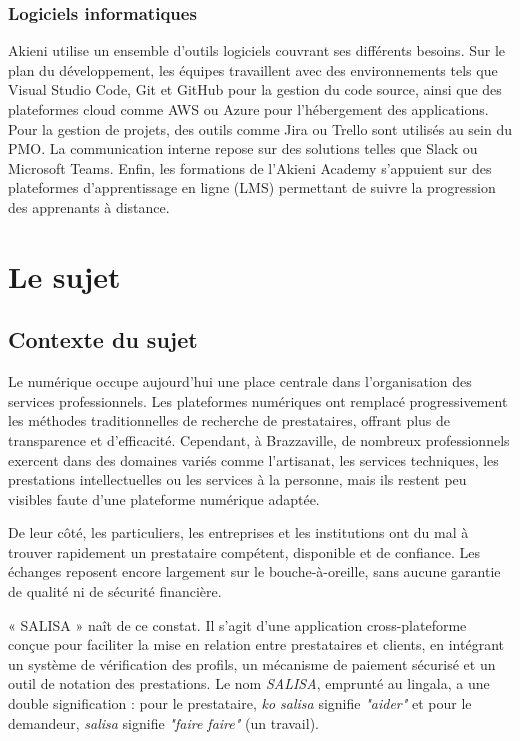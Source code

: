 \subsubsection{Logiciels informatiques}

Akieni utilise un ensemble d'outils logiciels couvrant ses différents besoins. Sur le plan du développement, les équipes travaillent avec des environnements tels que Visual Studio Code, Git et GitHub pour la gestion du code source, ainsi que des plateformes cloud comme AWS ou Azure pour l'hébergement des applications. Pour la gestion de projets, des outils comme Jira ou Trello sont utilisés au sein du PMO. La communication interne repose sur des solutions telles que Slack ou Microsoft Teams. Enfin, les formations de l'Akieni Academy s'appuient sur des plateformes d'apprentissage en ligne (LMS) permettant de suivre la progression des apprenants à distance.

\section{Le sujet}

\subsection{Contexte du sujet}

Le numérique occupe aujourd'hui une place centrale dans l'organisation des services professionnels. Les plateformes numériques ont remplacé progressivement les méthodes traditionnelles de recherche de prestataires, offrant plus de transparence et d'efficacité. Cependant, à Brazzaville, de nombreux professionnels exercent dans des domaines variés comme l'artisanat, les services techniques, les prestations intellectuelles ou les services à la personne, mais ils restent peu visibles faute d'une plateforme numérique adaptée.

De leur côté, les particuliers, les entreprises et les institutions ont du mal à trouver rapidement un prestataire compétent, disponible et de confiance. Les échanges reposent encore largement sur le bouche-à-oreille, sans aucune garantie de qualité ni de sécurité financière.

« SALISA » naît de ce constat. Il s'agit d'une application cross-plateforme conçue pour faciliter la mise en relation entre prestataires et clients, en intégrant un système de vérification des profils, un mécanisme de paiement sécurisé et un outil de notation des prestations. Le nom \textit{SALISA}, emprunté au lingala, a une double signification : pour le prestataire, \textit{ko salisa} signifie \textit{"aider"} et pour le demandeur, \textit{salisa} signifie \textit{"faire faire"} (un travail).

